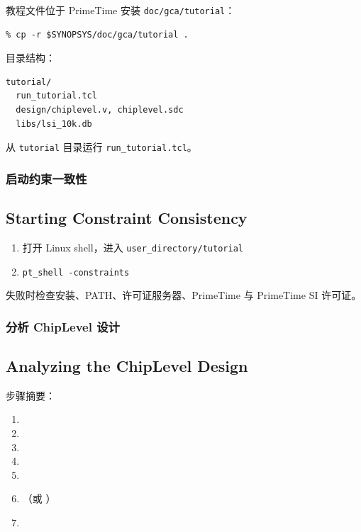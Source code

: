 教程文件位于 PrimeTime 安装 \texttt{doc/gca/tutorial}：
\begin{lstlisting}
% cp -r $SYNOPSYS/doc/gca/tutorial .
\end{lstlisting}

目录结构：
\begin{verbatim}
tutorial/
  run_tutorial.tcl
  design/chiplevel.v, chiplevel.sdc
  libs/lsi_10k.db
\end{verbatim}

从 \texttt{tutorial} 目录运行 \texttt{run\_tutorial.tcl}。

\subsubsection{启动约束一致性}
\subsection*{Starting Constraint Consistency}

\begin{enumerate}
  \item 打开 Linux shell，进入 \texttt{user\_directory/tutorial}
  \item \texttt{pt\_shell -constraints}
\end{enumerate}

失败时检查安装、PATH、许可证服务器、PrimeTime 与 PrimeTime SI 许可证。

\subsubsection{分析 ChipLevel 设计}
\subsection*{Analyzing the ChipLevel Design}

步骤摘要：
\begin{enumerate}
  \item {}
  \item {}
  \item {}
  \item {}
  \item {}
  \item {}（或 ）
  \item {}
\end{enumerate}

